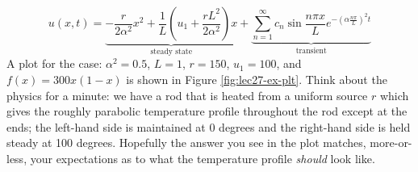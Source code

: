 \begin{equation*}
u(x,t) = \underbrace{-\frac{r}{2\alpha^2}x^2 + \frac{1}{L}\left(u_1+\frac{rL^2}{2 \alpha^2}\right)x}_{\text{steady state}} + \underbrace{\sum\limits_{n=1}^{\infty} c_n \sin{\frac{n \pi x}{L}}e^{-\left(\alpha \frac{n \pi}{L}\right)^2 t}}_{\text{transient}}
\end{equation*}
A plot for the case: $\alpha^2 = 0.5$, $L=1$, $r=150$, $u_1=100$, and $f(x) = 300x(1-x)$ is shown in Figure \ref{fig:lec27-ex-plt}. Think about the physics for a minute: we have a rod that is heated from a uniform source $r$ which gives the roughly parabolic temperature profile throughout the rod except at the ends; the left-hand side is maintained at 0 degrees and the right-hand side is held steady at 100 degrees. Hopefully the answer you see in the plot matches, more-or-less, your expectations as to what the temperature profile \emph{should} look like. 

